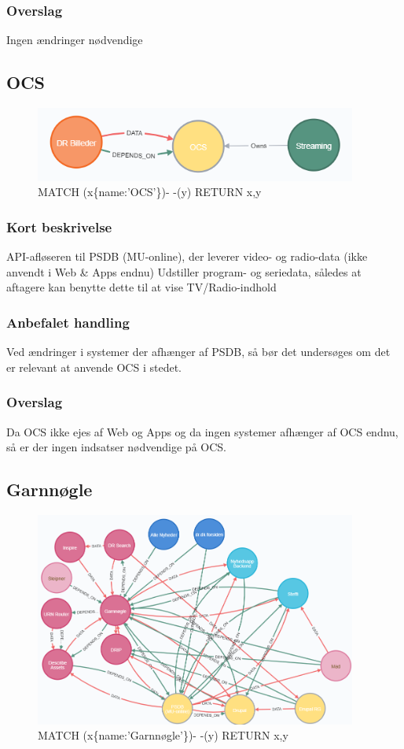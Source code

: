 \documentclass{article}
\begin{document}
\subsubsection{Overslag}
Ingen ændringer nødvendige


\subsection{OCS}
\begin{figure}[h]
\includegraphics[width=300pt]{OCS.PNG}
\caption{MATCH (x\{name:'OCS'\})- -(y) RETURN x,y}
\end{figure}
\subsubsection{Kort beskrivelse}
API-afløseren til PSDB (MU-online), der leverer video- og radio-data (ikke anvendt i Web \& Apps endnu)	Udstiller program- og seriedata, således at aftagere kan benytte dette til at vise TV/Radio-indhold
\subsubsection{Anbefalet handling}
Ved ændringer i systemer der afhænger af PSDB, så bør det undersøges om det er relevant at anvende OCS i stedet.
\subsubsection{Overslag}
Da OCS ikke ejes af Web og Apps og da ingen systemer afhænger af OCS endnu, så er der ingen indsatser nødvendige på OCS.


\subsection{Garnnøgle}
\begin{figure}[h]
\includegraphics[width=300pt]{Garnnoegle.PNG}
\caption{MATCH (x\{name:'Garnnøgle'\})- -(y) RETURN x,y}
\end{figure}
\end{document}
